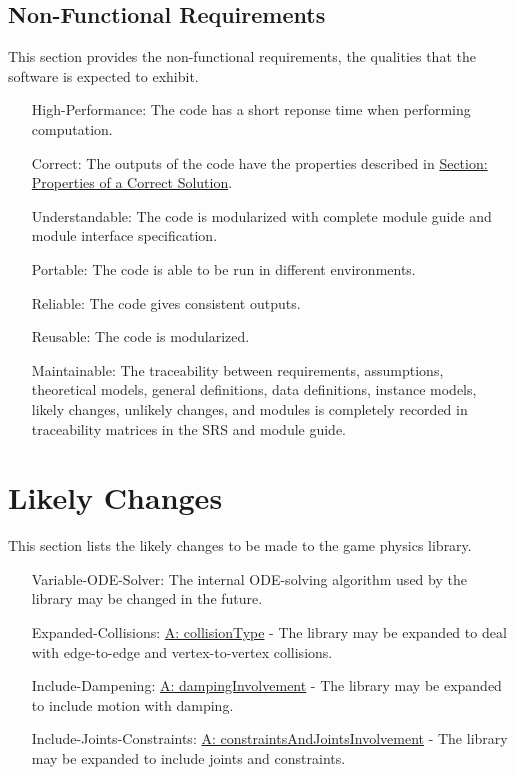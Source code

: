\documentclass[12pt]{article}
\begin{document}
\subsection{Non-Functional Requirements}
\label{Sec:NFRs}
This section provides the non-functional requirements, the qualities that the software is expected to exhibit.
\begin{itemize}
\item[High-Performance:\phantomsection\label{highPerformance}]The code has a short reponse time when performing computation.
\item[Correct:\phantomsection\label{correct}]The outputs of the code have the properties described in \hyperref[Sec:CorSolProps]{Section: Properties of a Correct Solution}.
\item[Understandable:\phantomsection\label{understandable}]The code is modularized with complete module guide and module interface specification.
\item[Portable:\phantomsection\label{portable}]The code is able to be run in different environments.
\item[Reliable:\phantomsection\label{reliable}]The code gives consistent outputs.
\item[Reusable:\phantomsection\label{reusable}]The code is modularized.
\item[Maintainable:\phantomsection\label{maintainable}]The traceability between requirements, assumptions, theoretical models, general definitions, data definitions, instance models, likely changes, unlikely changes, and modules is completely recorded in traceability matrices in the SRS and module guide.
\end{itemize}
\section{Likely Changes}
\label{Sec:LCs}
This section lists the likely changes to be made to the game physics library.
\begin{itemize}
\item[Variable-ODE-Solver:\phantomsection\label{lcVODES}]The internal ODE-solving algorithm used by the library may be changed in the future.
\item[Expanded-Collisions:\phantomsection\label{lcEC}]\hyperref[assumpCT]{A: collisionType} - The library may be expanded to deal with edge-to-edge and vertex-to-vertex collisions.
\item[Include-Dampening:\phantomsection\label{lcID}]\hyperref[assumpDI]{A: dampingInvolvement} - The library may be expanded to include motion with damping.
\item[Include-Joints-Constraints:\phantomsection\label{lcIJC}]\hyperref[assumpCAJI]{A: constraintsAndJointsInvolvement} - The library may be expanded to include joints and constraints.
\end{itemize}
\end{document}

